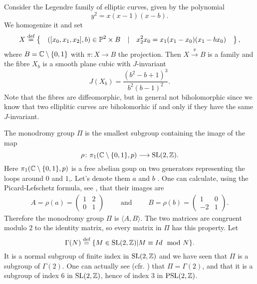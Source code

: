 \documentclass[../main.tex]{subfiles}
\begin{document}
\begin{es}
Consider the Legendre family of elliptic curves, given by the polynomial
\[
y^2=x(x-1)(x-b).
\]
We homogenize it and set
 \[
X \stackrel{\text{def}}{=}  \left\{ \quad ([x_0, x_1, x_2], b) \in \mathbb{P}^2 \times B \quad | \quad x_2^2x_0 = x_1(x_1 - x_0)(x_1 - bx_0) \quad \right\},
 \]
where $B = \mathbb{C} \setminus \{0, 1\}$ with $\pi \colon X \to B$ the projection. Then $X \xrightarrow{\pi} B$ is a family and the fibre $X_b$ is a smooth plane cubic with $J$-invariant
\[
J(X_b) = \frac{(b^2 - b + 1)^3}{b^2(b - 1)^2} .
\]
Note that the fibres are diffeomorphic, but in general not biholomorphic since we know that two elliplitic curves are biholomorhic if and only if they have the same $J$-invariant.

The monodromy group $\Pi$ is the smallest subgroup containing the image of the map
\[
\rho \colon \pi_1(\mathbb{C} \setminus \{0,1\},p) \longrightarrow \mathrm{SL}(2,\mathbb{Z}).
\]
Here $\pi_1(\mathbb{C} \setminus \{0,1\},p)$ is a free abelian goup on two generators representing the loops around $0$ and $1$,. Let's denote them $a$ and $b$ . One can calculate, using the Picard-Lefschetz formula, see \cite[Sect. 1]{CMSP03}, that their images are
\begin{align*}
    A=\rho(a)= \left( \begin{array}{cc} 1 & 2 \\ 0 & 1 \end{array} \right) \qquad \text{ and } \qquad B=\rho(b)= \left( \begin{array}{cc} 1 & 0 \\ -2 & 1 \end{array} \right).
\end{align*}
Therefore the monodromy group $\Pi$ is $\langle A,B \rangle$.
The two matrices are congruent modulo $2$ to the identity matrix, so every matrix in $\Pi$ has this property. Let
\[
\Gamma(N) \stackrel{\text{def}}{=}  \{ M \in \mathrm{SL}(2, \mathbb{Z}) | M \equiv Id \mod N \}.
\]
It is a normal subgroup of finite index in $\mathrm{SL}(2, \mathbb{Z})$ and  we have seen that $\Pi$ is a subgroup of $\Gamma(2)$.
One can actually see (cfr. \cite{Cl80}) that $\Pi = \Gamma(2)$, and that it is a subgroup of index $6$ in $\mathrm{SL}(2, \mathbb{Z})$, hence of index $3$ in $\mathrm{PSL}(2, \mathbb{Z})$.
\end{es}
\end{document}
